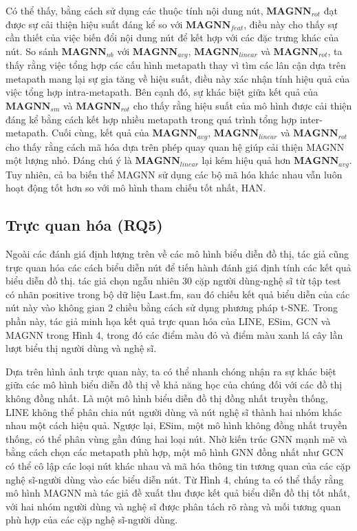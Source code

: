 Có thể thấy, bằng cách sử dụng các thuộc tính nội dung nút, $\mathbf{MAGNN}_{rot}$ đạt được sự cải thiện hiệu suất đáng kể so với $\mathbf{MAGNN}_{feat}$, điều này cho thấy sự cần thiết của việc biến đổi nội dung nút để kết hợp với các đặc trưng khác của nút. So sánh $\mathbf{MAGNN}_{nb}$ với $\mathbf{MAGNN}_{avg}$, $\mathbf{MAGNN}_{linear}$ và $\mathbf{MAGNN}_{rot}$, ta thấy rằng việc tổng hợp các cấu hình metapath thay vì tìm các lân cận dựa trên metapath mang lại sự gia tăng về hiệu suất, điều này xác nhận tính hiệu quả của việc tổng hợp intra-metapath. Bên cạnh đó, sự khác biệt giữa kết quả của $\mathbf{MAGNN}_{sm}$ và $\mathbf{MAGNN}_{rot}$ cho thấy rằng hiệu suất của mô hình được cải thiện đáng kể bằng cách kết hợp nhiều metapath trong quá trình tổng hợp inter-metapath. Cuối cùng, kết quả của $\mathbf{MAGNN}_{avg}$, $\mathbf{MAGNN}_{linear}$ và $\mathbf{MAGNN}_{rot}$ cho thấy rằng cách mã hóa dựa trên phép quay quan hệ giúp cải thiện MAGNN một lượng nhỏ. Đáng chú ý là $\mathbf{MAGNN}_{linear}$ lại kém hiệu quả hơn $\mathbf{MAGNN}_{avg}$. Tuy nhiên, cả ba biến thể MAGNN sử dụng các bộ mã hóa khác nhau vẫn luôn hoạt động tốt hơn so với mô hình tham chiếu tốt nhất, HAN.

\subsection{Trực quan hóa (RQ5)}
Ngoài các đánh giá định lượng trên về các mô hình biểu diễn đồ thị, tác giả cũng trực quan hóa các cách biểu diễn nút để tiến hành đánh giá định tính các kết quả biểu diễn đồ thị. tác giả chọn ngẫu nhiên 30 cặp người dùng-nghệ sĩ từ tập test có nhãn positive trong bộ dữ liệu Last.fm, sau đó chiếu kết quả biểu diễn của các nút này vào không gian 2 chiều bằng cách sử dụng phương pháp t-SNE. Trong phần này, tác giả minh họa kết quả trực quan hóa của LINE, ESim, GCN và MAGNN trong Hình 4, trong đó các điểm màu đỏ và điểm màu xanh lá cây lần lượt biểu thị người dùng và nghệ sĩ.

Dựa trên hình ảnh trực quan này, ta có thể nhanh chóng nhận ra sự khác biệt giữa các mô hình biểu diễn đồ thị về khả năng học của chúng đối với các đồ thị không đồng nhất. Là một mô hình biểu diễn đồ thị đồng nhất truyền thống, LINE không thể phân chia nút người dùng và nút nghệ sĩ thành hai nhóm khác nhau một cách hiệu quả. Ngược lại, ESim, một mô hình không đồng nhất truyền thống, có thể phân vùng gần đúng hai loại nút. Nhờ kiến trúc GNN mạnh mẽ và bằng cách chọn các metapath phù hợp, một mô hình GNN đồng nhất như GCN có thể cô lập các loại nút khác nhau và mã hóa thông tin tương quan của các cặp nghệ sĩ-người dùng vào các biểu diễn nút. Từ Hình 4, chúng ta có thể thấy rằng mô hình MAGNN mà tác giả đề xuất thu được kết quả biểu diễn đồ thị tốt nhất, với hai nhóm người dùng và nghệ sĩ được phân tách rõ ràng và mối tương quan phù hợp của các cặp nghệ sĩ-người dùng.
